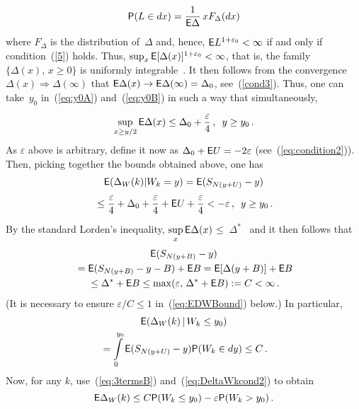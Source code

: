 \begin{multicols}{2}
\noindent
$$
{\sf P}(L\in dx)=\displaystyle\frac{\displaystyle 1\mathstrut}{\displaystyle {\sf E} \Delta\mathstrut}\,xF_\Delta(dx)
$$
where $F_\Delta$ is the distribution of~$\Delta$  and, hence, ${\sf E}
L^{1+\varepsilon_0}<\infty$  if and only if  condition~(\ref{5}) holds. Thus,  
$\sup_x {\sf E}[\Delta(x)]^{1+\varepsilon_0}<\infty$, that is, the family 
$\{\Delta(x),\,x\ge 0\}$ is uniformly integrable~\cite{Billingsley}. 
It then follows from the convergence $ \Delta(x)\Rightarrow 
\Delta(\infty)$ that ${\sf E}\Delta(x)\to {\sf E} \Delta(\infty)=\Delta_0$, 
see~(\ref{cond3}).  Thus, one can take~$y_0$ in~(\ref{eq:y0A}) 
and~(\ref{eq:y0B}) in such a way that simultaneously,
\begin{equation*}
\sup\limits_{x\ge y/2}{\sf E}\Delta(x) \le 
\Delta_{0}+\displaystyle\frac{\displaystyle \varepsilon\mathstrut}{\displaystyle 4\mathstrut}\,,\enskip y\ge y_{0}\,.
\end{equation*}
As $\varepsilon $ above is arbitrary, define it now    as
$\Delta_{0}+{\sf E} U=-2\varepsilon $ (see~(\ref{eq:condition2})).  Then,
picking together the bounds obtained above, one has
\begin{multline}
{\sf E}(\Delta_{W}(k)|W_{k}=y)={\sf E}(S_{N(y+U)}-y) \\
{}\le
\displaystyle\frac{\displaystyle \varepsilon\mathstrut}{\displaystyle 4\mathstrut}+\Delta_{0}+\displaystyle\frac{\displaystyle \varepsilon\mathstrut}{\displaystyle 4\mathstrut}+{\sf E}
U+\displaystyle\frac{\displaystyle \varepsilon\mathstrut}{\displaystyle 4\mathstrut}<-\varepsilon\,, \enskip y\ge
y_{0}\,.
\label{eq:3termsB}
\end{multline} 
By the standard Lorden's inequality,  
$\sup\limits_x{\sf E}\Delta(x)$\linebreak $\le\;\Delta^*$~\cite{Asmus} and it then follows that
\begin{multline*}
 {\sf E}(S_{N(y+B)}-y)\\
 {}={\sf E}(S_{N(y+B)}-y-B)+{\sf E} B={\sf E}[\Delta(y+B)]+{\sf E} B \\
{} \le  \Delta^{*}+{\sf E} B\le\max(\varepsilon,\,\Delta^{*}+{\sf E} B):=
C<\infty\,.
\end{multline*} 
(It is necessary to ensure $\varepsilon/C\le1$ in~(\ref{eq:EDWBound}) 
below.) In particular,
\begin{multline}
{\sf E}(\Delta_{W}(k)\,\vert\, W_{k}\le y_{0}) \\
{}=\int\limits_0^{y_0}{\sf E}( 
S_{N(y+U)}-y){\sf P}(W_k\in dy) \le C\,.
\label{eq:DeltaWkcond2}
\end{multline}
Now, for any $k$, use~(\ref{eq:3termsB}) and~(\ref{eq:DeltaWkcond2}) to obtain
 \begin{equation} 
 {\sf E}\Delta_{W}(k)\le C{\sf P}(W_{k}\le
y_{0})-\varepsilon{\sf P}(W_{k}>y_{0})\,.
\label{eq:CPeP}
\end{equation}

\end{multicols}
